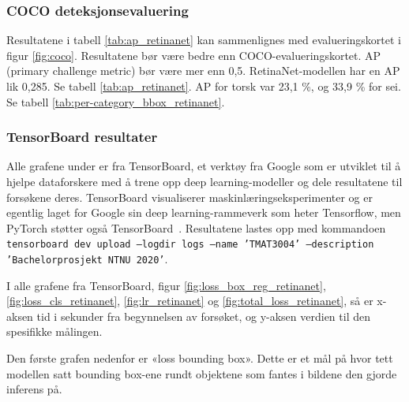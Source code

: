 \subsubsection{COCO deteksjonsevaluering} 

Resultatene i tabell \ref{tab:ap_retinanet} kan sammenlignes med evalueringskortet i figur \ref{fig:coco}. Resultatene bør være bedre enn COCO-evalueringskortet. AP (primary challenge metric) bør være mer enn 0,5. RetinaNet-modellen har en AP lik 0,285. Se tabell \ref{tab:ap_retinanet}. AP for torsk var 23,1 \%, og 33,9 \% for sei. Se tabell \ref{tab:per-category_bbox_retinanet}.



\subsubsection{TensorBoard resultater}

Alle grafene under er fra TensorBoard, et verktøy fra Google som er utviklet til å hjelpe dataforskere med å trene opp deep learning-modeller og dele resultatene til forsøkene deres. TensorBoard visualiserer maskinlæringseksperimenter og er egentlig laget for Google sin deep learning-rammeverk som heter Tensorflow, men PyTorch støtter også TensorBoard \cite{Oshri 2019}. Resultatene lastes opp med kommandoen \texttt{tensorboard dev upload --logdir logs --name 'TMAT3004' --description 'Bachelorprosjekt NTNU 2020'}.

I alle grafene fra TensorBoard, figur \ref{fig:loss_box_reg_retinanet}, \ref{fig:loss_cls_retinanet}, \ref{fig:lr_retinanet} og \ref{fig:total_loss_retinanet}, så er x-aksen tid i sekunder fra begynnelsen av forsøket, og y-aksen verdien til den spesifikke målingen. 

Den første grafen nedenfor er «loss bounding box». Dette er et mål på hvor tett modellen satt bounding box-ene rundt objektene som fantes i bildene den gjorde inferens på.

